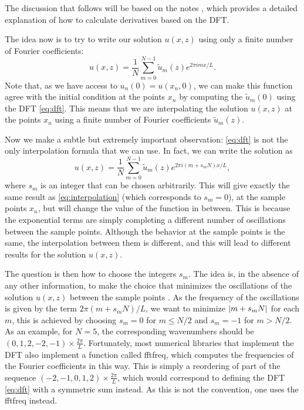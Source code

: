 \documentclass[openany,a4paper,oneside,11pt]{article}
\begin{document}
The discussion that follows will be based on the notes \cite{fftderiv}, which provides a detailed explanation of how to calculate derivatives based on the DFT.

The idea now is to try to write our solution $u(x,z)$ using only a finite number of Fourier coefficients:
\begin{equation}
\label{eq:interpolation}
    u(x,z) = \frac{1}{N}\sum_{m=0}^{N-1} \tilde{u}_m(z) e^{2\pi i m x/L}.
\end{equation}
Note that, as we have access to $u_n(0) = u(x_n, 0)$, we can make this function agree with the initial condition at the points $x_n$ by computing the $\tilde{u}_m(0)$ using the DFT \eqref{eq:dft}. This means that we are interpolating the solution $u(x,z)$ at the points $x_n$ using a finite number of Fourier coefficients $\tilde{u}_m(z)$.

Now we make a subtle but extremely important observation: \eqref{eq:dft} is not the only interpolation formula that we can use. In fact, we can write the solution as
\begin{equation}
\label{eq:interpolation2}
    u(x,z) = \frac{1}{N}\sum_{m=0}^{N-1} \tilde{u}_m(z) e^{2\pi i (m + s_m N) x/L},
\end{equation}
where $s_m$ is an integer that can be chosen arbitrarily. This will give exactly the same result as \eqref{eq:interpolation} (which corresponds to $s_m = 0$), at the sample points $x_n$, but will change the value of the function in between. This is because the exponential terms are simply completing a different number of oscillations between the sample points. Although the behavior at the sample points is the same, the interpolation between them is different, and this will lead to different results for the solution $u(x,z)$.

The question is then how to choose the integers $s_m$. The idea is, in the absence of any other information, to make the choice that minimizes the oscillations of the solution $u(x,z)$ between the sample points \cite{fftderiv}. As the frequency of the oscillations is given by the term $2\pi (m + s_m N) / L$, we want to minimize $\abs{m + s_m N}$ for each $m$, this is achieved by choosing $s_m = 0$ for $m \le N/2$ and $s_m = -1$ for $m > N/2$. As an example, for $N = 5$, the corresponding wavenumbers should be $(0, 1, 2, -2, -1) \times \frac{2\pi}{L}$. Fortunately, most numerical libraries that implement the DFT also implement a function called fftfreq, which computes the frequencies of the Fourier coefficients in this way. This is simply a reordering of part of the sequence $(-2, -1, 0, 1, 2) \times \frac{2\pi}{L}$, which would correspond to defining the DFT \eqref{eq:dft} with a symmetric sum instead. As this is not the convention, one uses the fftfreq instead. 
\end{document}
